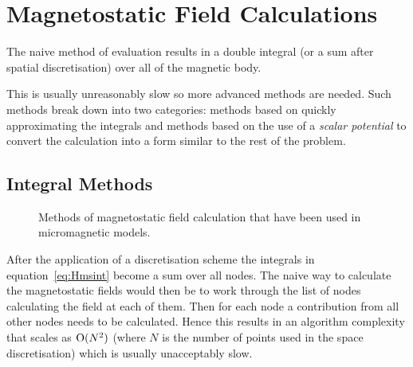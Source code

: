 \section{Magnetostatic Field Calculations}

The naive method of evaluation results in a double integral (or a sum after spatial discretisation) over all of the magnetic body. 

This is usually unreasonably slow so more advanced methods are needed. Such methods break down into two categories: methods based on quickly approximating the integrals and methods based on the use of a \emph{scalar potential} to convert the calculation into a form similar to the rest of the problem.

\subsection{Integral Methods}
\label{sec:magstat-field-calc-inte}

\begin{figure}[\figpos]
  \centering
  \caption{Methods of magnetostatic field calculation that have been used in micromagnetic models.}
  \label{fig:types-mag-stat}
\end{figure}

After the application of a discretisation scheme the integrals in equation~\eqref{eq:Hmsint} become a sum over all nodes. The naive way to calculate the magnetostatic fields would then be to work through the list of nodes calculating the field at each of them. Then for each node a contribution from all other nodes needs to be calculated. Hence this results in an algorithm complexity that scales as $\text{O}(N^2)$ (where $N$ is the number of points used in the space discretisation) which is usually unacceptably slow.

